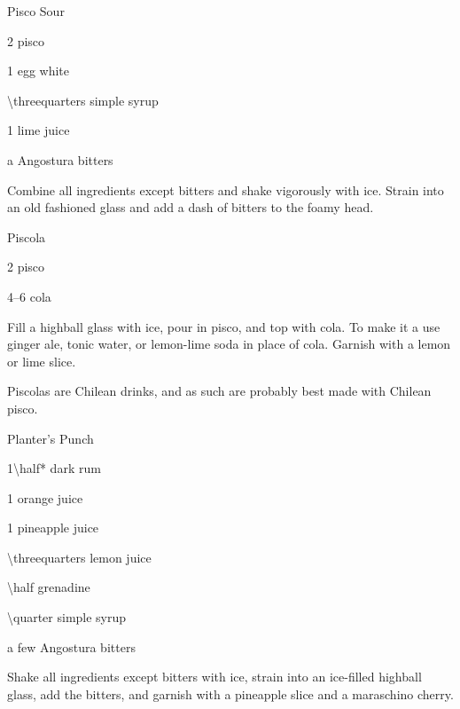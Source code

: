 \begin{Cocktail}{Pisco Sour}
  \begin{Ingredients}
  \item \SI{2}{\oz} pisco
  \item 1 egg white
  \item \SI{\threequarters}{\oz} simple syrup
  \item \SI{1}{\oz} lime juice
  \item a \si{\dash} Angostura bitters
  \end{Ingredients}
  
  \begin{Instructions}
	Combine all ingredients except bitters and shake vigorously with ice.  Strain into an old fashioned glass and add a dash of bitters to the foamy head.
  \end{Instructions}
\end{Cocktail}

\begin{Cocktail}{Piscola}
  \begin{Ingredients}
  \item \SI{2}{\oz} pisco
  \item \SIrange{4}{6}{\oz} cola
  \end{Ingredients}
  
  \begin{Instructions}
	Fill a highball glass with ice, pour in pisco, and top with cola.  To make it a  use ginger ale, tonic water, or lemon-lime soda in place of cola.  Garnish with a lemon or lime slice.
	
	Piscolas are Chilean drinks, and as such are probably best made with Chilean pisco.
  \end{Instructions}
\end{Cocktail}

\begin{Cocktail}{Planter's Punch}
  \begin{Ingredients}
  \item \SI{1\half*}{\oz} dark rum
  \item \SI{1}{\oz} orange juice
  \item \SI{1}{\oz} pineapple juice
  \item \SI{\threequarters}{\oz} lemon juice
  \item \SI{\half}{\oz} grenadine
  \item \SI{\quarter}{\oz} simple syrup
  \item a few \si{\dashes} Angostura bitters
  \end{Ingredients}
  
  \begin{Instructions}
	Shake all ingredients except bitters with ice, strain into an ice-filled highball glass, add the bitters, and garnish with a pineapple slice and a maraschino cherry.
  \end{Instructions}
\end{Cocktail}

